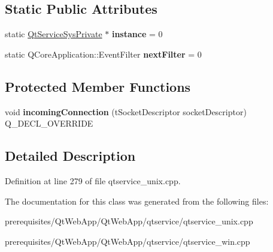 \subsection*{Static Public Attributes}
\begin{DoxyCompactItemize}
\item 
\mbox{\label{class_qt_service_sys_private_a1c67be022e972d4e1f7d9aad91464222}} 
static \mbox{\hyperlink{class_qt_service_sys_private}{Qt\+Service\+Sys\+Private}} $\ast$ {\bfseries instance} = 0
\item 
\mbox{\label{class_qt_service_sys_private_aeb77807c5daf3c8f1386ffec7a9157c7}} 
static Q\+Core\+Application\+::\+Event\+Filter {\bfseries next\+Filter} = 0
\end{DoxyCompactItemize}
\subsection*{Protected Member Functions}
\begin{DoxyCompactItemize}
\item 
\mbox{\label{class_qt_service_sys_private_af33e49296c17528601b4aeb93638e979}} 
void {\bfseries incoming\+Connection} (t\+Socket\+Descriptor socket\+Descriptor) Q\+\_\+\+D\+E\+C\+L\+\_\+\+O\+V\+E\+R\+R\+I\+DE
\end{DoxyCompactItemize}


\subsection{Detailed Description}


Definition at line 279 of file qtservice\+\_\+unix.\+cpp.



The documentation for this class was generated from the following files\+:\begin{DoxyCompactItemize}
\item 
prerequisites/\+Qt\+Web\+App/\+Qt\+Web\+App/qtservice/qtservice\+\_\+unix.\+cpp\item 
prerequisites/\+Qt\+Web\+App/\+Qt\+Web\+App/qtservice/qtservice\+\_\+win.\+cpp\end{DoxyCompactItemize}
